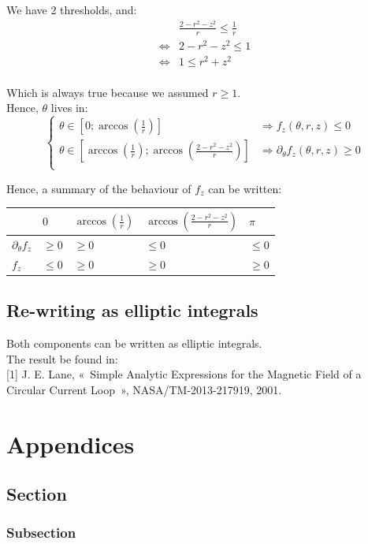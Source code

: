 \documentclass[a4paper,11pt,twoside,titlepage,openright]{book}
\numberwithin{equation}{section}
\begin{document}
We have 2 thresholds, and:
$$
\begin{array}{ll}
    & \frac{2 - r^2 - z^2}{r} \leq \frac{1}{r}\\
    \Leftrightarrow
    & 2 - r^2 - z^2 \leq 1\\
    \Leftrightarrow
    & 1 \leq r^2 + z^2\\
\end{array}
$$

Which is always true because we assumed $r \geq 1$.\\
Hence, $\theta$ lives in:
$$
\left\{
\begin{array}{ll}
    \theta \in [0; \arccos(\frac{1}{r})]
    & \Rightarrow f_z(\theta, r, z) \leq 0\\
    \theta \in [\arccos(\frac{1}{r}); \arccos(\frac{2-r^2-z^2}{r})]
    & \Rightarrow \partial_{\theta} f_z(\theta, r, z) \geq 0\\
\end{array}
\right.
$$


Hence, a summary of the behaviour of $f_z$ can be written:

\begin{table}[h]
    \centering
    \begin{tabular}{|l|l|l|l|l|}
        \hline
              & $0$ & $\arccos(\frac{1}{r})$ & $\arccos(\frac{2 - r^2 - z^2}{r})$ & $\pi$ \\ \hline
        $\partial_{\theta} f_z$ & $\geq 0$ & $\geq 0$ & $\leq 0$ & $\leq 0$ \\ \hline
        $f_z$ & $\leq 0$ & $\geq 0$ & $\geq 0$ & $\geq 0$ \\ \hline
    \end{tabular}
\end{table}


\section{Re-writing as elliptic integrals}

Both components can be written as elliptic integrals.\\
The result be found in:\\

[1] J. E. Lane, « Simple Analytic Expressions for the Magnetic Field of a
Circular Current Loop », NASA/TM-2013-217919, 2001.





\appendix
\chapter{Appendices}

\section{Section}
\subsection{Subsection}
\end{document}
